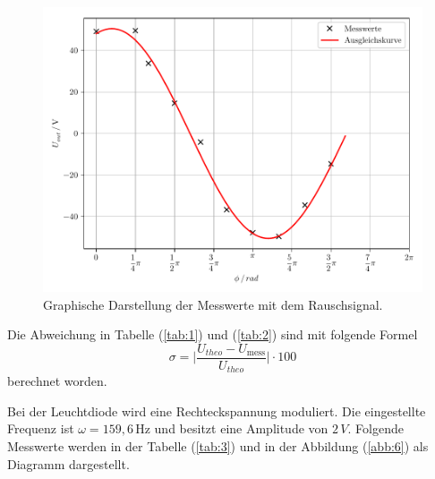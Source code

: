 \begin{figure}[H]
	\centering
	\includegraphics{plot5.pdf}
	\caption{Graphische Darstellung der Messwerte mit dem Rauschsignal.}
	\label{abb:8}
\end{figure}


Die Abweichung in Tabelle (\ref{tab:1}) und (\ref{tab:2}) sind mit folgende Formel
\begin{equation*}
  \sigma = \biggl| \frac{U_{theo}-U_\text{mess}}{U_{theo}} \biggl| \cdot 100
\end{equation*}
berechnet worden.

Bei der Leuchtdiode wird eine Rechteckspannung moduliert. Die eingestellte Frequenz ist $\omega = 159,6 \, \si{\hertz}$ und
besitzt eine Amplitude von $2 \, V$.
Folgende Messwerte werden in der Tabelle (\ref{tab:3}) und in der Abbildung (\ref{abb:6}) als
Diagramm dargestellt.

